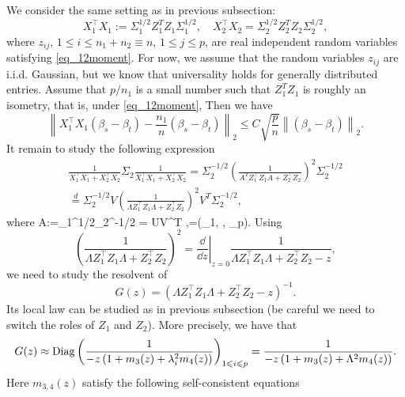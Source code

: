 We consider the same setting as in previous subsection: 
$$ X_1^{\top}X_1:=\Sigma_1^{1/2}  Z_1^T Z_1 \Sigma_1^{1/2} ,\quad X_2^{\top}X_2= \Sigma_2^{1/2}  Z_2^T Z_2 \Sigma_2^{1/2},$$
where $z_{ij}$, $1 \leq i \leq n_1+n_2\equiv n$, $1 \leq j \leq p$, are real independent random variables satisfying \eqref{eq_12moment}. For now, we assume that the random variables $z_{ij}$ are i.i.d. Gaussian, but we know that universality holds for generally distributed entries. Assume that $p/n_1$ is a small number such that $Z_1^TZ_1$ is roughly an isometry, that is, under \eqref{eq_12moment}, 
Then we have
$$  \left\|X_1^{\top}X_1 (\beta_s - \beta_t)  - \frac{n_1}{n}(\beta_s - \beta_t)\right\|_2 \le C \sqrt{\frac{p}{n}} \left\| (\beta_s - \beta_t)\right\|_2. $$
It remain to study the following expression 
\begin{align*}
\frac{1}{X_1^{\top}X_1 + X_2^{\top}X_2}  \Sigma_2 \frac{1}{X_1^{\top}X_1 + X_2^{\top}X_2}  = \Sigma_2^{-1/2}\left(\frac{1}{A^T Z_1^{\top}Z_1 A + Z_2^{\top}Z_2} \right)^2 \Sigma_2^{-1/2} \\
\stackrel{d}{=} \Sigma_2^{-1/2}V \left(\frac{1}{\Lambda Z_1^{\top}Z_1 \Lambda + Z_2^{\top}Z_2} \right)^2 V^T \Sigma_2^{-1/2},
\end{align*}
where 
\be  \label{eigen2}
A:=\Sigma_1^{1/2}\Sigma_2^{-1/2} = U\Lambda V^T ,\quad \Lambda=(\lambda_1, \cdots, \lambda_p).
\ee
Using 
$$\left(\frac{1}{\Lambda Z_1^{\top}Z_1 \Lambda + Z_2^{\top}Z_2} \right)^2 =\left. \frac{\dd }{\dd z}\right|_{z=0}\frac{1}{\Lambda Z_1^{\top}Z_1 \Lambda + Z_2^{\top}Z_2 - z} ,$$
we  need to study the resolvent of 
$$G(z) = \left( \Lambda Z_1^{\top}Z_1 \Lambda + Z_2^{\top}Z_2 - z \right)^{-1}.$$
Its local law can be studied as in previous subsection (be careful we need to switch the roles of $Z_1$ and $Z_2$). More precisely,  we have that 
$$ G(z) \approx \operatorname{Diag}\left( \frac{1}{-z\left( 1+ m_3(z) + \lambda_i^2 m_4(z)\right)}\right)_{1\leqslant i \leqslant p}= \frac{1}{-z\left( 1+ m_3(z) + \Lambda^2 m_4(z)\right)} .$$
Here $m_{3,4}(z)$ satisfy the following self-consistent equations
